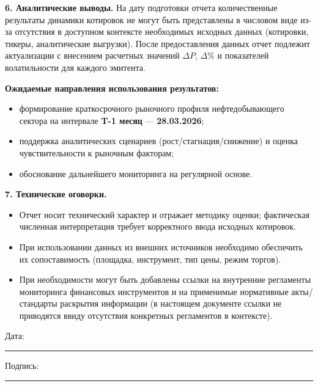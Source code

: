 \documentclass[12pt]{article}
\begin{document}
\bigskip

\noindent
\textbf{6. Аналитические выводы.}
На дату подготовки отчета количественные результаты динамики котировок не могут быть представлены в числовом виде из-за отсутствия в доступном контексте необходимых исходных данных (котировки, тикеры, аналитические выгрузки). После предоставления данных отчет подлежит актуализации с внесением расчетных значений $\Delta P$, $\Delta \%$ и показателей волатильности для каждого эмитента.

\medskip
\noindent
\textbf{Ожидаемые направления использования результатов:}
\begin{itemize}
    \item формирование краткосрочного рыночного профиля нефтедобывающего сектора на интервале \textbf{T-1 месяц} — \textbf{28.03.2026};
    \item поддержка аналитических сценариев (рост/стагнация/снижение) и оценка чувствительности к рыночным факторам;
    \item обоснование дальнейшего мониторинга на регулярной основе.
\end{itemize}

\bigskip

\noindent
\textbf{7. Технические оговорки.}
\begin{itemize}
    \item Отчет носит технический характер и отражает методику оценки; фактическая численная интерпретация требует корректного ввода исходных котировок.
    \item При использовании данных из внешних источников необходимо обеспечить их сопоставимость (площадка, инструмент, тип цены, режим торгов).
    \item При необходимости могут быть добавлены ссылки на внутренние регламенты мониторинга финансовых инструментов и на применимые нормативные акты/стандарты раскрытия информации (в настоящем документе ссылки не приводятся ввиду отсутствия конкретных регламентов в контексте).
\end{itemize}

\vfill

\noindent
Дата: \rule{5cm}{0.4pt} \hfill Подпись: \rule{5cm}{0.4pt}
\end{document}
